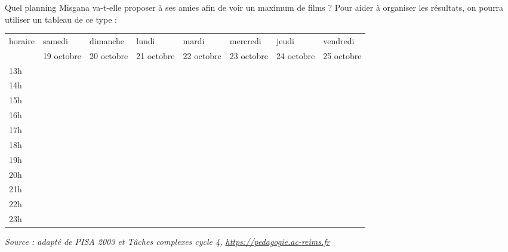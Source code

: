 Quel planning Misgana va-t-elle proposer à ses amies afin de voir un maximum de films ? Pour aider à organiser les résultats, on pourra utiliser un tableau de ce type :
\begin{center}
   \small
   \begin{tabular}{|p{1.5cm}|p{1.5cm}|p{1.5cm}|p{1.5cm}|p{1.5cm}|p{1.5cm}|p{1.5cm}|p{1.5cm}|}
      \hline
      horaire & samedi & dimanche & lundi & mardi & mercredi & jeudi & vendredi \\
      & 19 octobre & 20 octobre & 21 octobre & 22 octobre & 23 octobre & 24 octobre & 25 octobre \\
      \hline
      13h & & & & & & & \\ [1.5mm]
      14h & & & & & & & \\ [1.5mm]
      15h & & & & & & & \\ [1.5mm]
      16h & & & & & & & \\ [1.5mm]
      17h & & & & & & & \\ [1.5mm]
      18h & & & & & & & \\ [1.5mm]
      19h & & & & & & & \\ [1.5mm]
      20h & & & & & & & \\ [1.5mm]
      21h & & & & & & & \\ [1.5mm]
      22h & & & & & & & \\ [1.5mm]
      23h & & & & & & & \\ [1.5mm]
      \hline
   \end{tabular}
\end{center}

\hfill {\footnotesize\it Source : adapté de PISA 2003 et Tâches complexes cycle 4, \url{https://pedagogie.ac-reims.fr} }

